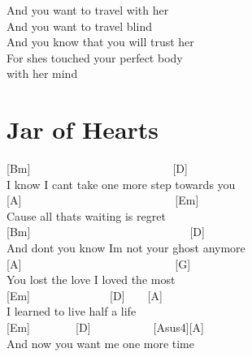 \documentclass[
  letterpaper,
  a5paper]{memoir}
\begin{document}
And you want to travel with her\\
And you want to travel blind\\
And you know that you will trust her\\
For she\textquotesingle s touched your perfect body\\
with her mind

\hypertarget{jar-of-hearts}{%
\chapter{Jar of Hearts}\label{jar-of-hearts}}

{[}Bm{]}~~~~~~~~~~~~~~~~~~~~~~~~~{[}D{]}\\
I know I can\textquotesingle t take one more step towards you\\
{[}A{]}~~~~~~~~~~~~~~~~~~~~~~~~~~~{[}Em{]}\\
\textquotesingle Cause all thats waiting is regret\\
{[}Bm{]}~~~~~~~~~~~~~~~~~~~~~~~~~~~~{[}D{]}\\
And don\textquotesingle t you know I\textquotesingle m not your ghost
anymore\\
{[}A{]}~~~~~~~~~~~~~~~~~~~~~~~~~~~{[}G{]}\\
You lost the love I loved the most\\
{[}Em{]}~~~~~~~~~~~~~~{[}D{]}~~~~{[}A{]}\\
I learned to live half a life\\
{[}Em{]}~~~~~~~~{[}D{]}~~~~~~~~~~~{[}Asus4{]}{[}A{]}\\
And now you want me one more time
\end{document}
